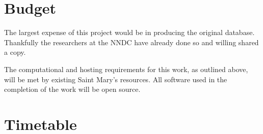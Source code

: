 \documentclass[12pt]{article}
\begin{document}
\begin{doublespacing}
\pagebreak
\section{Budget}
The largest expense of this project would be in producing the original database.
Thankfully the researchers at the NNDC have already done so and willing shared a copy.

The computational and hosting requirements for this work, as outlined above, will be met by existing Saint Mary's resources.
All software used in the completion of the work will be open source.

\pagebreak
\section{Timetable}

\pagebreak
\end{doublespacing}


\end{document}
